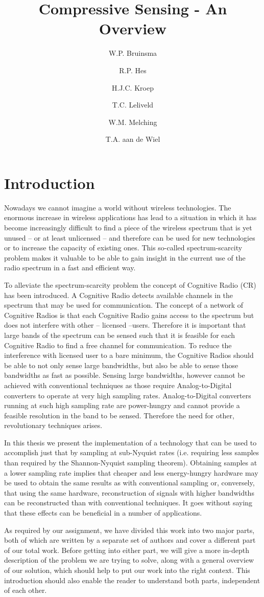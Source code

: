 \documentclass[a4paper, openany, oneside]{memoir}
\title{Compressive Sensing - An Overview}
\author{W.P. Bruinsma \and R.P. Hes \and H.J.C. Kroep \and T.C. Leliveld \and W.M. Melching \and T.A. aan de Wiel}
\begin{document}
\chapter{Introduction}
Nowadays we cannot imagine a world without wireless technologies. The enormous increase in wireless applications has lead to a situation in which it has become increasingly difficult to find a piece of the wireless spectrum that is yet unused -- or at least unlicensed -- and therefore can be used for new technologies or to increase the capacity of existing ones. This so-called spectrum-scarcity problem makes it valuable to be able to gain insight in the current use of the radio spectrum in a fast and efficient way.

To alleviate the spectrum-scarcity problem the concept of Cognitive Radio (CR) has been introduced. A Cognitive Radio detects available channels in the spectrum that may be used for communication. The concept of a network of Cognitive Radios is that each Cognitive Radio gains access to the spectrum but does not interfere with other -- licensed --users. Therefore it is important that large bands of the spectrum can be sensed such that it is feasible for each Cognitive Radio to find a free channel for communication. To reduce the interference with licensed user to a bare minimum, the Cognitive Radios should be able to not only sense large bandwidths, but also be able to sense those bandwidths as fast as possible. Sensing large bandwidths, however cannot be achieved with conventional techniques as those require Analog-to-Digital converters to operate at very high sampling rates. Analog-to-Digital converters running at such high sampling rate are power-hungry and cannot provide a feasible resolution in the band to be sensed. Therefore the need for other, revolutionary techniques arises.

In this thesis we present the implementation of a technology that can be used to accomplish just that by sampling at sub-Nyquist rates (i.e. requiring less samples than required by the Shannon-Nyquist sampling theorem).  Obtaining samples at a lower sampling rate implies that cheaper and less energy-hungry hardware may be used to obtain the same results as with conventional sampling or, conversely, that using the same hardware, reconstruction of signals with higher bandwidths can be reconstructed than with conventional techniques. It goes without saying that these effects can be beneficial in a number of applications.

As required by our assignment, we have divided this work into two major parts, both of which are written by a separate set of authors and cover a different part of our total work. Before getting into either part, we will give a more in-depth description of the problem we are trying to solve, along with a general overview of our solution, which should help to put our work into the right context. This introduction should also enable the reader to understand both parts, independent of each other.
\end{document}
